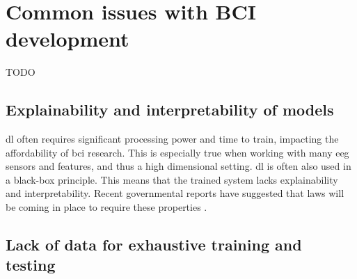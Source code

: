 
\section{Common issues with BCI development}
\label{sec:processing_signals_common_issues}
TODO


\subsection{Explainability and interpretability of models}
\label{subsec:processing_signals_common_issues_exaplainable}

\Gls{dl} often requires significant processing power and time to train, impacting the affordability of \gls{bci} research.
This is especially true when working with many \gls{eeg} sensors and features, and thus a high dimensional setting. 
\Gls{dl} is often also used in a black-box principle.
This means that the trained system lacks explainability and interpretability.
Recent governmental reports have suggested that laws will be coming in place to require these properties \citep{eu_ai_blackbox_report, explainable_ai_policy}.


\subsection{Lack of data for exhaustive training and testing}
\label{subsec:processing_signals_common_issues_generalisation}
